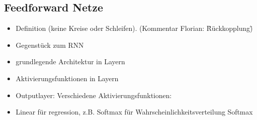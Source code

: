 


\subsection{Feedforward Netze}

\color{blue}
\begin{itemize}
	\item Definition (keine Kreise oder Schleifen). (Kommentar Florian: \"Rückkopplung\")
	\item Gegenstück zum RNN
	\item grundlegende Architektur in Layern 
	\item Aktivierungsfunktionen in Layern
	\item Outputlayer: Verschiedene Aktivierungsfunktionen:
	\item Linear für regression, z.B. Softmax für Wahrscheinlichkeitsverteilung Softmax
\end{itemize}
\color{black}



